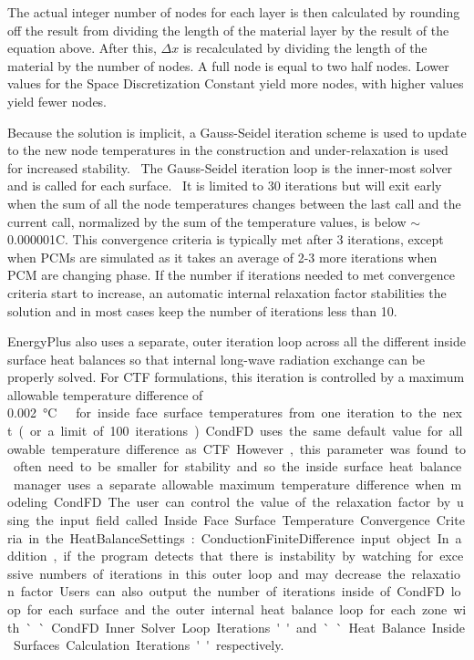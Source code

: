 The actual integer number of nodes for each layer is then calculated by rounding
off the result from dividing the length of the material layer by the result of
the equation above. After this, $\Delta x$ is recalculated by dividing the
length of the material by the number of nodes. A full node is equal to two half
nodes. Lower values for the Space Discretization Constant yield more nodes, with
higher values yield fewer nodes.

Because the solution is implicit, a Gauss-Seidel iteration scheme is used to
update to the new node temperatures in the construction and under-relaxation is
used for increased stability.~ The Gauss-Seidel iteration loop is the inner-most
solver and is called for each surface.~ It is limited to 30 iterations but will
exit early when the sum of all the node temperatures changes between the last
call and the current call, normalized by the sum of the temperature values, is
below $\sim$0.000001C. This convergence criteria is typically met after 3
iterations, except when PCMs are simulated as it takes an average of 2-3 more
iterations when PCM are changing phase. If the number if iterations needed to
met convergence criteria start to increase, an automatic internal relaxation
factor stabilities the solution and in most cases keep the number of iterations
less than 10.

EnergyPlus also uses a separate, outer iteration loop across all the different
inside surface heat balances so that internal long-wave radiation exchange can
be properly solved. For CTF formulations, this iteration is controlled by a
maximum allowable temperature difference of \SI{0.002}\celsius\ for inside face
surface temperatures from one iteration to the next (or a limit of 100 iterations).
CondFD uses the same default value for allowable temperature difference as CTF.
However, this parameter was found to often need to be smaller for stability and
so the inside surface heat balance manager uses a separate allowable maximum
temperature difference when modeling CondFD. The user can control the value of
the relaxation factor by using the input field called Inside Face Surface
Temperature Convergence Criteria in the
HeatBalanceSettings:ConductionFiniteDifference input object. In addition, if
the program detects that there is instability by watching for excessive numbers
of iterations in this outer loop and may decrease the relaxation factor. Users
can also output the number of iterations inside of CondFD loop for each surface
and the outer internal heat balance loop for each zone with ``CondFD Inner
Solver Loop Iterations'' and ``Heat Balance Inside Surfaces Calculation
Iterations'' respectively.

